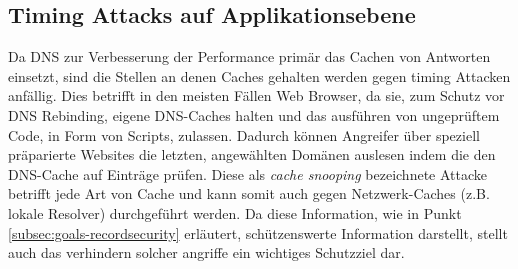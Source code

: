 \subsection{Timing Attacks auf Applikationsebene}
Da DNS zur Verbesserung der Performance primär das Cachen von Antworten einsetzt, sind die Stellen an denen Caches gehalten werden gegen timing Attacken anfällig. Dies betrifft in den meisten Fällen Web Browser, da sie, zum Schutz vor DNS Rebinding, eigene DNS-Caches halten und das ausführen von ungeprüftem Code, in Form von Scripts, zulassen. Dadurch können Angreifer über speziell präparierte Websites die letzten, angewählten Domänen auslesen indem die den DNS-Cache auf Einträge prüfen. Diese als \textit{cache snooping} bezeichnete Attacke betrifft jede Art von Cache und kann somit auch gegen Netzwerk-Caches (z.B. lokale Resolver) durchgeführt werden. Da diese Information, wie in Punkt \ref{subsec:goals-recordsecurity} erläutert, schützenswerte Information darstellt, stellt auch das verhindern solcher angriffe ein wichtiges Schutzziel dar.